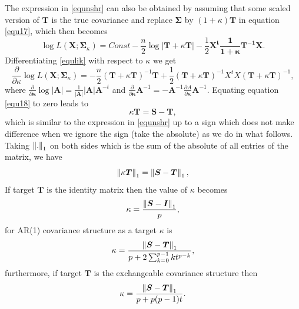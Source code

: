 The expression in \ref{equnshr} can also be obtained by assuming that some scaled version of $\boldsymbol{T}$ is the true covariance and replace $\boldsymbol{\Sigma}$ by $(1+\kappa)\boldsymbol{T}$ in equation \ref{equ17}, which then becomes
\begin{equation}
 \log L(\boldsymbol{X};\boldsymbol{\Sigma}_{\kappa}) = Const - \frac{n}{2} \log\left|\boldsymbol{T} + \kappa \boldsymbol{T} \right|-\frac{1}{2}\boldsymbol{X^t \frac{1}{1+\kappa}\boldsymbol{T}^{-1} X}.
 \label{equlik}
\end{equation} 
Differentiating \ref{equlik} with respect to $\kappa$ we get
\begin{equation}
\frac{\partial}{\partial \kappa} \log L(\boldsymbol{X};\boldsymbol{\Sigma}_{\kappa}) = - \frac{n}{2} (\boldsymbol{T} + \kappa \boldsymbol{T})^{-1} \boldsymbol{T} + \frac{1}{2} (\boldsymbol{T} + \kappa \boldsymbol{T})^{-1} X^t  X (\boldsymbol{T} + \kappa \boldsymbol{T})^{-1},
\label{equ18}
\end{equation}
where $\frac{\partial}{\partial \boldsymbol{\kappa}} \log |\boldsymbol{A}| = \frac{1}{|\boldsymbol{A}|} |\boldsymbol{A}| \boldsymbol{A}^{-t}$ and $\frac{\partial}{\partial \boldsymbol{\kappa}} \boldsymbol{A}^{-1} = -\boldsymbol{A}^{-1} \frac{\partial A}{\partial \boldsymbol{\kappa}} \boldsymbol{A}^{-1}$. Equating equation \ref{equ18} to zero leads to
\begin{equation*}
 \kappa \boldsymbol{T} = \boldsymbol{S} - \boldsymbol{T},
\end{equation*}
which is similar to the expression in \ref{equnshr} up to a sign which does not make difference when we ignore the sign (take the absolute) as we do in what follows.
Taking $\left\lVert.\right\rVert_{1}$ on both sides which is the sum of the absolute of all entries of the matrix, we have
\begin{equation}
 \norm{\kappa \boldsymbol{T}}_{1} = \norm{\boldsymbol{S} - \boldsymbol{T}}_{1},
\label{equ19}
\end{equation}
If target $\boldsymbol{T}$ is the identity matrix then the value of $\kappa$ becomes
\begin{equation}
\kappa = \frac{\left\lVert\boldsymbol{S} - \boldsymbol{I}\right\rVert_{1}}{p},
\end{equation}
for AR(1) covariance structure as a target $\kappa$ is
\begin{equation}
\kappa = \frac{\left\lVert\boldsymbol{S} - \boldsymbol{T}\right\rVert_{1}}{p + 2\sum_{k=0}^{p-1} kt^{p-k}},
\end{equation}
furthermore, if target $\boldsymbol{T}$ is the exchangeable covariance structure then
\begin{equation}
\kappa = \frac{\left\lVert\boldsymbol{S} - \boldsymbol{T}\right\rVert_{1}}{p + p(p-1)t}.
\end{equation}

